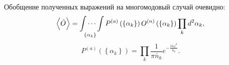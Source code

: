 Обобщение полученных выражений на многомодовый случай очевидно: 
\begin{equation}
\left<\hat{O}\right> = \idotsint\limits_{\left\{\alpha_k\right\}}
P^{(a)}
\left(
\left\{\alpha_k\right\}
\right)
O^{(n)}
\left(
\left\{\alpha_k\right\}
\right)
\prod_k d^2 \alpha_k,
\label{eqCh1_113}
\end{equation}
\[
P^{(a)}
\left(
\left\{\alpha_k\right\}
\right)
=
\prod_k \frac{1}{\pi \bar{n}_k}
e^{-\frac{\left|\alpha_k\right|^2}{\bar{n}_k}}. 
\]

